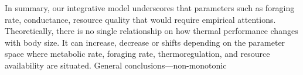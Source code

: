 In summary, our integrative model underscores that parameters such as foraging rate, conductance, resource quality that would require empirical attentions.
Theoretically, there is no single relationship on how thermal performance changes with body size.
It can increase, decrease or shifts depending on the parameter space where metabolic rate, foraging rate, thermoregulation, and resource availability are situated.
General conclusions---non-monotonic



%
%
%
 
